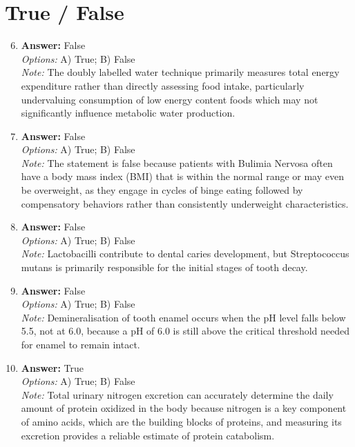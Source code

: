\documentclass[12pt]{article}
\begin{document}
\section*{True / False}
\begin{enumerate}[label=\arabic*.]
\setcounter{enumi}{5}
\item \textbf{Answer:} False
\\ \textit{Options:} A) True; B) False
\\ \textit{Note:} The doubly labelled water technique primarily measures total energy expenditure rather than directly assessing food intake, particularly undervaluing consumption of low energy content foods which may not significantly influence metabolic water production.
\item \textbf{Answer:} False
\\ \textit{Options:} A) True; B) False
\\ \textit{Note:} The statement is false because patients with Bulimia Nervosa often have a body mass index (BMI) that is within the normal range or may even be overweight, as they engage in cycles of binge eating followed by compensatory behaviors rather than consistently underweight characteristics.
\item \textbf{Answer:} False
\\ \textit{Options:} A) True; B) False
\\ \textit{Note:} Lactobacilli contribute to dental caries development, but Streptococcus mutans is primarily responsible for the initial stages of tooth decay.
\item \textbf{Answer:} False
\\ \textit{Options:} A) True; B) False
\\ \textit{Note:} Demineralisation of tooth enamel occurs when the pH level falls below 5.5, not at 6.0, because a pH of 6.0 is still above the critical threshold needed for enamel to remain intact.
\item \textbf{Answer:} True
\\ \textit{Options:} A) True; B) False
\\ \textit{Note:} Total urinary nitrogen excretion can accurately determine the daily amount of protein oxidized in the body because nitrogen is a key component of amino acids, which are the building blocks of proteins, and measuring its excretion provides a reliable estimate of protein catabolism.
\end{enumerate}
\end{document}
